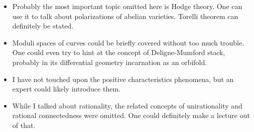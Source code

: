 \documentclass[11pt]{article}
\numberwithin{equation}{section}
\numberwithin{footnote}{section}
\begin{document}
\smallskip
\begin{itemize}

\item
Probably the most important topic omitted here is Hodge theory. One can use it to talk about polarizations 
of abelian varieties. Torelli theorem can definitely be stated.

\item
Moduli spaces of curves could be briefly covered without too much trouble. One could even try to hint at the concept of Deligne-Mumford stack, probably in its differential geometry incarnation as an orbifold.

\item 
I have not touched upon the positive characteristics phenomena, but an expert could likely introduce them. 

\item
While I talked about rationality, the related concepts of unirationality and rational connectedness were omitted. One could definitely make a lecture out of that.

\end{itemize}
\end{document}
